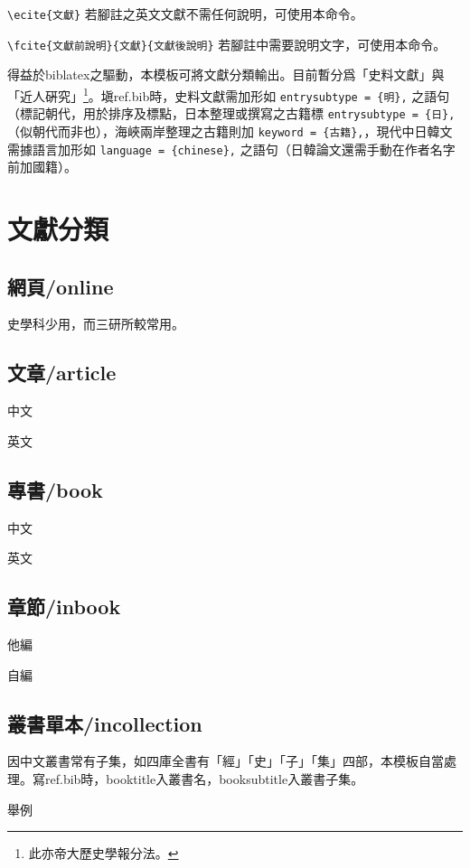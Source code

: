 \documentclass[12pt]{NTUhw}
\begin{document}
\verb|\ecite{文獻}| 若腳註之英文文獻不需任何說明，可使用本命令。

\verb|\fcite{文獻前說明}{文獻}{文獻後說明}| 若腳註中需要說明文字，可使用本命令。

得益於biblatex之驅動，本模板可將文獻分類輸出。目前暫分爲「史料文獻」與「近人硏究」\footnote{\ttfamily 此亦帝大歷史學報分法。}。塡ref.bib時，史料文獻需加形如 \verb|entrysubtype = {明},| 之語句（標記朝代，用於排序及標點，日本整理或撰寫之古籍標 \verb|entrysubtype = {日},| （似朝代而非也），海峽兩岸整理之古籍則加 \verb|keyword = {古籍},|，現代中日韓文需據語言加形如 \verb|language = {chinese},| 之語句（日韓論文還需手動在作者名字前加國籍）。

\section*{文獻分類}

\subsection*{網頁/online}
史學科少用，而三研所較常用。

\subsection*{文章/article}
中文

英文

\subsection*{專書/book}
中文

英文

\subsection*{章節/inbook}
他編

自編

\subsection*{叢書單本/incollection}
因中文叢書常有子集，如四庫全書有「經」「史」「子」「集」四部，本模板自當處理。寫ref.bib時，booktitle入叢書名，booksubtitle入叢書子集。

舉例
\end{document}
